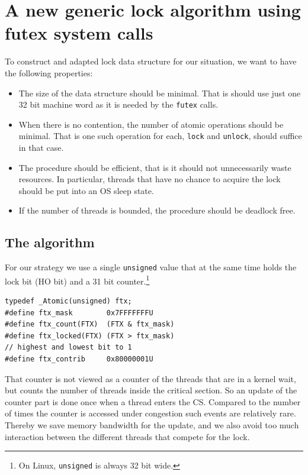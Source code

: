 \section{A new generic lock algorithm using futex system calls}
\label{sec-3}

To construct and adapted lock data structure for our situation, we
want to have the following properties:

\begin{itemize}
\item The size of the data structure should be minimal. That is should
use just one 32 bit machine word as it is needed by the \texttt{futex}
calls.\itemadjust

\item When there is no contention, the number of atomic operations should
be minimal. That is one such operation for each, \texttt{lock} and
\texttt{unlock}, should suffice in that case.\itemadjust

\item The procedure should be efficient, that is it should not
unnecessarily waste resources. In particular, threads that have no
chance to acquire the lock should be put into an OS sleep
state.\itemadjust

\item If the number of threads is bounded, the procedure should be
deadlock free.\itemadjust
\end{itemize}

\subsection{The algorithm}
\label{sec-3-1}

For our strategy we use a single \texttt{unsigned} value that at the same
time holds the lock bit (HO bit) and a 31 bit counter.\footnote{On Linux, \texttt{unsigned} is always 32 bit wide.}

\lstset{language=C11,label= ,caption= ,numbers=none}
\begin{lstlisting}
typedef _Atomic(unsigned) ftx;
#define ftx_mask        0x7FFFFFFFU
#define ftx_count(FTX)  (FTX & ftx_mask)
#define ftx_locked(FTX) (FTX > ftx_mask)
// highest and lowest bit to 1
#define ftx_contrib     0x80000001U
\end{lstlisting}

That counter is not viewed as a counter of the threads that are in
a kernel wait, but counts the number of threads inside the critical
section.  So an update of the counter part is done once when a
thread enters the CS. Compared to the number of times
the counter is accessed under congestion such events are relatively
rare. Thereby we save memory bandwidth for the update, and we also
avoid too much interaction between the different threads that
compete for the lock.

